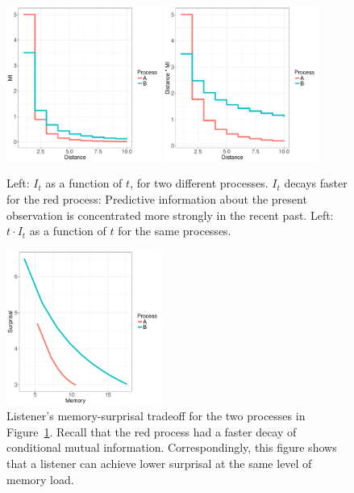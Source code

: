 \begin{figure}
\includegraphics[width=0.45\textwidth]{figures/decay.pdf}
\includegraphics[width=0.45\textwidth]{figures/memory.pdf}
%
	\caption{Left: $I_t$ as a function of $t$, for two different processes. $I_t$ decays faster for the red process: Predictive information about the present observation is concentrated more strongly in the recent past. Left: $t \cdot I_t$ as a function of $t$ for the same processes. }\label{fig:basic}
\end{figure}

\begin{figure}
\includegraphics[width=0.45\textwidth]{figures/listener-tradeoff.pdf}
	\caption{Listener's memory-surprisal tradeoff for the two processes in Figure~\ref{fig:basic}. Recall that the red process had a faster decay of conditional mutual information. Correspondingly, this figure shows that a listener can achieve lower surprisal at the same level of memory load.}\label{fig:listener-tradeoff}
\end{figure}

